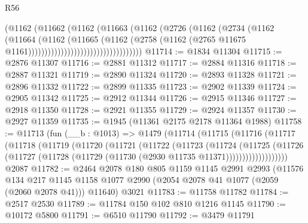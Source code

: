 \begin{lexlean}{R56}
\begin{coremodule}
                                          (@1162
                                            (@11662
                                              (@1162
                                                (@11663
                                                  (@1162
                                                    (@2726
                                                      (@1162
                                                        (@2734
                                                          (@1162
                                                            (@11664
                                                              (@1162
                                                                (@11665
                                                                  (@1162
                                                                    (@2758
                                                                      (@1162
                                                                        (@2765
                                                                          @11675
                                                                          @1161)))))))))))))))))))))))))))))))))))
@11714 := @1834 @11304
@11715 := @2876 @11307
@11716 := @2881 @11312
@11717 := @2884 @11316
@11718 := @2887 @11321
@11719 := @2890 @11324
@11720 := @2893 @11328
@11721 := @2896 @11332
@11722 := @2899 @11335
@11723 := @2902 @11339
@11724 := @2905 @11342
@11725 := @2912 @11344
@11726 := @2915 @11346
@11727 := @2918 @11350
@11728 := @2921 @11355
@11729 := @2924 @11357
@11730 := @2927 @11359
@11735 := @1945 (@11361 @2175 @2178 @11364 @1988)
@11758 := @11713
    (fun (__b : @1013) =>
    @1479
      (@11714
        (@11715
          (@11716
            (@11717
              (@11718
                (@11719
                  (@11720
                    (@11721
                      (@11722
                        (@11723
                          (@11724
                            (@11725
                              (@11726
                                (@11727
                                  (@11728 (@11729 (@11730 (@2930 @11735 @11371)))))))))))))))))))
    @2087
@11782 := @2464
    @2078
    @180
    @805
    @1159
    @1145
    @2991
    @2993
    (@11576
      @134
      @217
      @1145
      @1158
      @1077
      @2990
      (@2054 @2078 @41 @1077 (@2059 (@2060 @2078 @41)))
      @11640)
    @3021
@11783 := @11758 @11782
@11784 := @2517 @2530
@11789 := @11784 @150 @102 @810 @1216 @1145
@11790 := @10172 @5800
@11791 := @6510 @11790
@11792 := @3479 @11791

\end{coremodule}
\end{lexlean}
